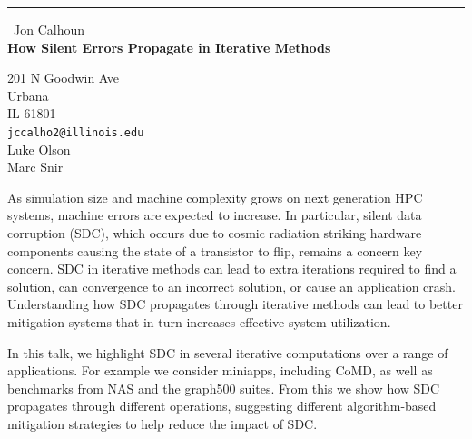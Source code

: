 \documentclass{report}
\begin{document}
\begin{center}
\rule{6in}{1pt} \
{\large Jon Calhoun \\
{\bf How Silent Errors Propagate in Iterative Methods}}

201 N Goodwin Ave \\ Urbana \\ IL 61801
\\
{\tt jccalho2@illinois.edu}\\
Luke Olson\\
Marc Snir\end{center}


As simulation size and machine complexity grows on next generation HPC
systems, machine errors are expected to increase. In particular, silent
data corruption (SDC), which occurs due to cosmic radiation striking
hardware components causing the state of a transistor to flip, remains a
concern key concern. SDC in iterative methods can lead to extra
iterations required to find a solution, can convergence to an incorrect
solution, or cause an application crash. Understanding how SDC propagates
through iterative methods can lead to better mitigation systems that in
turn increases effective system utilization.

In this talk, we highlight SDC in several iterative computations over a
range of applications. For example we consider miniapps, including CoMD,
as well as benchmarks from NAS and the graph500 suites. From this we show
how SDC propagates through different operations, suggesting different
algorithm-based mitigation strategies to help reduce the impact of SDC.
\end{document}
